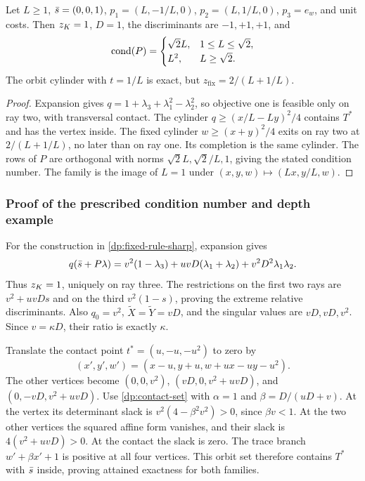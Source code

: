 \begin{proposition}\label{dp:rescaling}
Let $L\ge1$, $\bar s=(0,0,1)$,
$p_1=(L,-1/L,0)$, $p_2=(L,1/L,0)$, $p_3=e_w$, and unit costs.
Then $z_K=1$, $D=1$, the discriminants are $-1,+1,+1$, and
\[
 \operatorname{cond}(P)=\begin{cases}\sqrt2L,&1\le L\le\sqrt2,\\L^2,&L\ge\sqrt2.\end{cases}
\]
The orbit cylinder with $t=1/L$ is exact, but
$z_{\mathrm{fix}}=2/(L+1/L)$.
\end{proposition}

\begin{proof}
Expansion gives $q=1+\lambda_3+\lambda_1^2-\lambda_2^2$, so objective
one is feasible only on ray two, with transversal contact.
The cylinder $q\ge(x/L-Ly)^2/4$ contains $T^*$ and has the vertex inside.
The fixed cylinder $w\ge(x+y)^2/4$ exits on ray two at
$2/(L+1/L)$, no later than on ray one. Its completion is the same cylinder.
The rows of $P$ are orthogonal with norms $\sqrt2L,\sqrt2/L,1$,
giving the stated condition number. The family is the image of $L=1$
under $(x,y,w)\mapsto(Lx,y/L,w)$.
\end{proof}

\subsubsection{Proof of the prescribed condition number and depth example}\label{dp:fixed-rule-sharp-proof}

For the construction in \cref{dp:fixed-rule-sharp}, expansion gives
\[
 q(\bar s+P\lambda)=v^2(1-\lambda_3)+uvD(\lambda_1+\lambda_2)
                          +v^2D^2\lambda_1\lambda_2.
\]
Thus $z_K=1$, uniquely on ray three. The restrictions on the first two
rays are $v^2+uvDs$ and on the third $v^2(1-s)$, proving the extreme
relative discriminants. Also $q_0=v^2$, $\widetilde X=\widetilde Y=vD$,
and the singular values are $vD,vD,v^2$. Since $v=\kappa D$,
their ratio is exactly $\kappa$.

Translate the contact point $t^*=(u,-u,-u^2)$ to zero by
\[
 (x',y',w')=(x-u,y+u,w+ux-uy-u^2).
\]
The other vertices become $(0,0,v^2)$,
$(vD,0,v^2+uvD)$, and $(0,-vD,v^2+uvD)$.
Use \cref{dp:contact-set} with $\alpha=1$ and
$\beta=D/(uD+v)$. At the vertex its determinant slack is
$v^2(4-\beta^2v^2)>0$, since $\beta v<1$. At the two other vertices
the squared affine form vanishes, and their slack is
$4(v^2+uvD)>0$. At the contact the slack is zero.
The trace branch $w'+\beta x'+1$ is positive at all four vertices.
This orbit set therefore contains $T^*$ with $\bar s$ inside, proving
attained exactness for both families.

